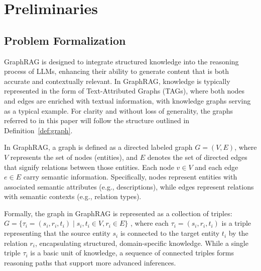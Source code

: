 \section{Preliminaries}
\label{section: GraphRAG}


\subsection{Problem Formalization}

GraphRAG is designed to integrate structured knowledge into the reasoning process of LLMs, enhancing their ability to generate content that is both accurate and contextually relevant.
In GraphRAG, knowledge is typically represented in the form of Text-Attributed Graphs (TAGs), where both nodes and edges are enriched with textual information, with knowledge graphs serving as a typical example.
For clarity and without loss of generality, the graphs referred to in this paper will follow the structure outlined in Definition~\ref{def:graph}.


\begin{definition}
	\label{def:graph}
In GraphRAG, a graph is defined as a directed labeled graph \( G = (V, E) \), where \( V \) represents the set of nodes (entities), and \( E \) denotes the set of directed edges that signify relations between those entities. Each node \( v \in V \) and each edge \( e \in E \) carry semantic information. Specifically, nodes represent entities with associated semantic attributes (e.g., descriptions), while edges represent relations with semantic contexts (e.g., relation types). 

Formally, the graph in GraphRAG is represented as a collection of triples: $G = \{ \tau_i = (s_i, r_i, t_i) \mid s_i, t_i \in V, r_i \in E \}$ , 
where each \( \tau_i = (s_i, r_i, t_i) \) is a triple representing that the source entity \( s_i \) is connected to the target entity \( t_i \) by the relation \( r_i \), encapsulating structured, domain-specific knowledge. While a single triple \( \tau_i \) is a basic unit of knowledge, a sequence of connected triples forms reasoning paths that support more advanced inferences.
\end{definition}


